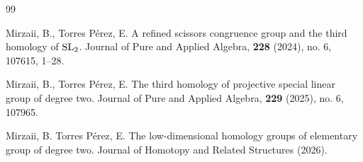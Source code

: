 \documentclass[11pt]{amsart}
\theoremstyle{definition}
\theoremstyle{plain}
\theoremstyle{definition}
\numberwithin{equation}{section}
\newcommand{\SL}{\mathit{{\rm SL}}}
\begin{document}
\begin{thebibliography}{99}
		
		
		
		
		
		
		
		
		Mirzaii, B., Torres Pérez, E.
		A refined scissors congruence group and the third homology of $\SL_2$. Journal of Pure and Applied Algebra, {\bf 228} (2024), no. 6, 107615, 1--28.
		
		Mirzaii, B., Torres Pérez, E.
		The third homology of projective special linear group of degree two. Journal of Pure and Applied Algebra, {\bf 229} (2025), no. 6, 107965.
		
		Mirzaii, B. Torres Pérez, E. The low-dimensional homology groups of elementary group of degree two. Journal of Homotopy and Related Structures (2026).
		
		
		

\end{thebibliography}
\end{document}
